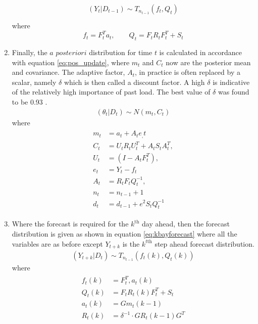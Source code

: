 \begin{enumerate}
\begin{align}
\begin{split}
(Y_t | D_{t-1}) \sim T_{n_{t-1}}(f_t,Q_t) \\
\end{split}
\end{align}
%
where
%
\begin{equation*}
f_t = F^T_t a_t, \qquad Q_t = F_t R_t F_t^T + S_t
\end{equation*}
%
\item Finally, the $a$ $posteriori$ distribution for time $t$ is calculated in accordance with equation \ref{eq:pos_update}, where $m_t$ and $C_t$ now are the posterior mean and covariance. The adaptive factor, $A_t$, in practice is often replaced by a scalar, namely $\delta$ which is then called a discount factor. A high $\delta$ is indicative of the relatively high importance of past load. The best value of $\delta$ was found to be 0.93 \citep{douglas98}.
%
\begin{align} \label{eq:pos_update}
(\theta_t|D_t) \sim N(m_t,C_t)
\end{align}
%
where
%
\begin{align*}
\begin{split}
m_t &= a_t + A_te_,t \\
C_t &= U_t R_t U_t^T + A_t S_t A_t^T, \\
U_t &= (I - A_tF_t^T), \\ 
e_t &= Y_t - f_t \\
A_t &= R_tF_tQ_t^{-1}, \\ 
n_t &= n_{t-1} + 1\\
d_t &= d_{t-1} + e^2S_tQ_t^{-1}
\end{split}
\end{align*}
%
\item Where the forecast is required for the $k^{\text{th}}$ day ahead, then the forecast distribution is given as shown in equation \ref{eq:kbayforecast} where all the variables are as before except $Y_{t+k}$ is the $k^{t\text{th}}$ step ahead forecast distribution.
%
\begin{align} \label{eq:kbayforecast}
(Y_{t+k}|D_t) \sim T_{n_{t-1}}(f_t(k),Q_t(k))
\end{align}
%
where
%
\begin{align*}
\begin{split}
f_t(k) &= F_t^T,a_t(k) \\
Q_t(k) &= F_t R_t(k) F_t^T + S_t \\
a_t(k) &= Gm_t(k-1) \\
R_t(k) &= \delta^{-1}\cdot GR_t(k-1)G^T
\end{split}
\end{align*}
%
\end{enumerate}

